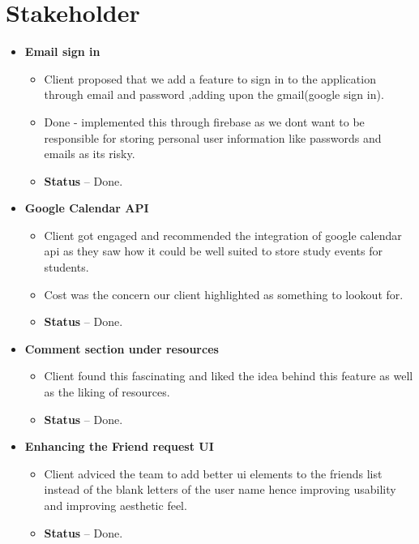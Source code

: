 \chapter{Stakeholder}

\begin{itemize}

    \item \textbf{Email sign in} 
    \begin{itemize}
        \item Client proposed that we add a feature to sign in to the application through email and password ,adding upon the gmail(google sign in).
        \item Done - implemented this through firebase as we dont want to be responsible for storing personal user information like passwords and emails as its risky.
        \item \textbf{Status} -- Done.
    \end{itemize}

    \item \textbf{Google Calendar API} 
    \begin{itemize}
        \item Client got engaged and recommended the integration of google calendar api as they saw how it could be well suited to store study events for students.
        \item Cost was the concern our client highlighted as something to lookout for.
        \item \textbf{Status} -- Done.
    \end{itemize}

    \item \textbf{Comment section under resources} 
    \begin{itemize}
        \item Client found this fascinating and liked the idea behind this feature as well as the liking of resources.
        \item \textbf{Status} -- Done.
    \end{itemize}
    
    \item \textbf{Enhancing the Friend request UI} 
    \begin{itemize}
        \item Client adviced the team to add better ui elements to the friends list instead of the blank letters of the user name hence improving usability and improving aesthetic feel.
        \item \textbf{Status} -- Done.
    \end{itemize}


\end{itemize}
